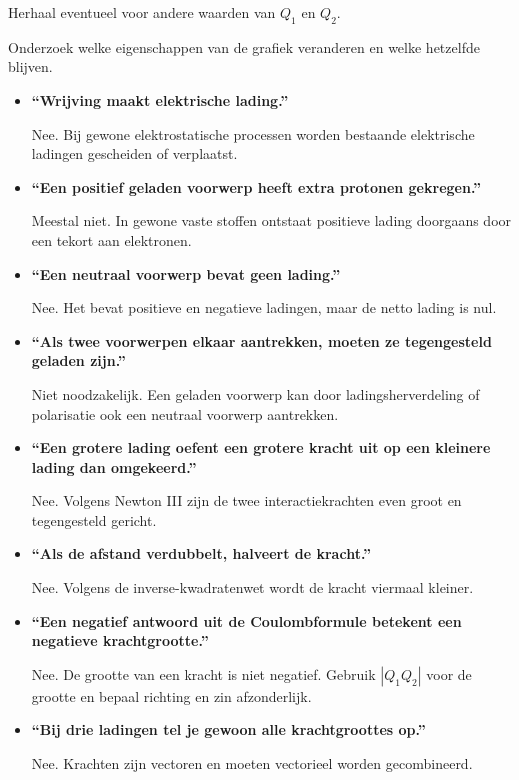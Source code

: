\documentclass{ximera}
\begin{document}
Herhaal eventueel voor andere waarden van $Q_1$ en $Q_2$.

Onderzoek welke eigenschappen van de grafiek veranderen en welke
hetzelfde blijven.




\begin{itemize}

  \item \textbf{``Wrijving maakt elektrische lading.''}

  Nee. Bij gewone elektrostatische processen worden bestaande
  elektrische ladingen gescheiden of verplaatst.

  \item \textbf{``Een positief geladen voorwerp heeft extra protonen
  gekregen.''}

  Meestal niet. In gewone vaste stoffen ontstaat positieve lading
  doorgaans door een tekort aan elektronen.

  \item \textbf{``Een neutraal voorwerp bevat geen lading.''}

  Nee. Het bevat positieve en negatieve ladingen, maar de netto lading
  is nul.

  \item \textbf{``Als twee voorwerpen elkaar aantrekken, moeten ze
  tegengesteld geladen zijn.''}

  Niet noodzakelijk. Een geladen voorwerp kan door ladingsherverdeling
  of polarisatie ook een neutraal voorwerp aantrekken.

  \item \textbf{``Een grotere lading oefent een grotere kracht uit op
  een kleinere lading dan omgekeerd.''}

  Nee. Volgens Newton III zijn de twee interactiekrachten even groot en
  tegengesteld gericht.

  \item \textbf{``Als de afstand verdubbelt, halveert de kracht.''}

  Nee. Volgens de inverse-kwadratenwet wordt de kracht viermaal kleiner.

  \item \textbf{``Een negatief antwoord uit de Coulombformule betekent
  een negatieve krachtgrootte.''}

  Nee. De grootte van een kracht is niet negatief. Gebruik
  $|Q_1Q_2|$ voor de grootte en bepaal richting en zin afzonderlijk.

  \item \textbf{``Bij drie ladingen tel je gewoon alle
  krachtgroottes op.''}

  Nee. Krachten zijn vectoren en moeten vectorieel worden gecombineerd.

\end{itemize}
\end{document}
